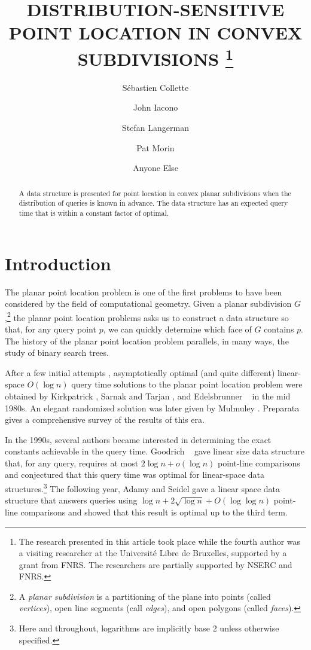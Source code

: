 \documentclass[charterfonts,lotsofwhite]{patmorin}
\title{\MakeUppercase{Distribution-Sensitive Point 
	Location in Convex Subdivisions}%
	\thanks{The research presented in this article took place
while the fourth author was a visiting researcher at the Universit\'e Libre de
Bruxelles, supported by a grant from FNRS.  The researchers are
partially supported by NSERC and FNRS.}}
\author{S\'ebastien Collette 
  \and John Iacono 
  \and Stefan Langerman 
  \and Pat Morin
  \and Anyone Else}
\date{}
\begin{document}
\maketitle

\begin{abstract}
A data structure is presented for point location in convex planar
subdivisions when the distribution of queries is known in advance.
The data structure has an expected query time that is within a
constant factor of optimal.
\end{abstract}


\section{Introduction}

The planar point location problem is one of the first problems to have
been considered by the field of computational geometry. Given a planar
subdivision $G$,\footnote{A \emph{planar subdivision} is a
partitioning of the plane into points (called \emph{vertices}), open
line segments (call \emph{edges}), and open polygons (called
\emph{faces}).} the planar point location problems asks us to
construct a data structure so that, for any query point $p$, we can
quickly determine which face of $G$ contains $p$.  The history of the
planar point location problem parallels, in many ways, the study of
binary search trees.

After a few initial attempts \cite{dl76,lp77,p81}, asymptotically
optimal (and quite different) linear-space $O(\log n)$ query time
solutions to the planar point location problem were obtained by
Kirkpatrick \cite{k83}, Sarnak and Tarjan \cite{st86}, and
Edelsbrunner \etal\ \cite{egs86} in the mid 1980s.  An elegant
randomized solution was later given by Mulmuley \cite{m90}.  Preparata
\cite{p90} gives a comprehensive survey of the results of this era.

In the 1990s, several authors became interested in determining the
exact constants achievable in the query time.  Goodrich \etal\
\cite{gor97} gave linear size data structure that, for any query,
requires at most $2\log n + o(\log n)$ point-line comparisons and
conjectured that this query time was optimal for linear-space data
structures.\footnote{Here and throughout, logarithms are implicitly
base 2 unless otherwise specified.} The following year, Adamy
and Seidel \cite{as98} gave a linear space data structure that answers
queries using $\log n + 2\sqrt{\log n} + O(\log\log n)$ point-line
comparisons and showed that this result is optimal up to the third
term.
\end{document}
